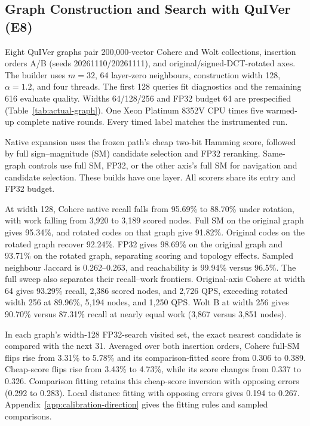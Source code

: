 \documentclass[twoside,11pt]{article}
\begin{document}
\subsection{Graph Construction and Search with QuIVer (E8)}
\label{sec:exp-graph}

Eight QuIVer graphs pair 200{,}000-vector Cohere and Wolt collections, insertion orders A/B (seeds 20261110/20261111), and original/signed-DCT-rotated axes. The builder uses $m=32$, 64 layer-zero neighbours, construction width 128, $\alpha=1.2$, and four threads. The first 128 queries fit diagnostics and the remaining 616 evaluate quality. Widths 64/128/256 and FP32 budget 64 are prespecified (Table~\ref{tab:actual-graph}). One Xeon Platinum 8352V CPU times five warmed-up complete native rounds. Every timed label matches the instrumented run.

Native expansion uses the frozen path's cheap two-bit Hamming score, followed by full sign--magnitude (SM) candidate selection and FP32 reranking. Same-graph controls use full SM, FP32, or the other axis's full SM for navigation and candidate selection. These builds have one layer. All scorers share its entry and FP32 budget.



At width 128, Cohere native recall falls from 95.69\% to 88.70\% under rotation, with work falling from 3{,}920 to 3{,}189 scored nodes. Full SM on the original graph gives 95.34\%, and rotated codes on that graph give 91.82\%. Original codes on the rotated graph recover 92.24\%. FP32 gives 98.69\% on the original graph and 93.71\% on the rotated graph, separating scoring and topology effects. Sampled neighbour Jaccard is 0.262--0.263, and reachability is 99.94\% versus 96.5\%. The full sweep also separates their recall--work frontiers. Original-axis Cohere at width 64 gives 93.29\% recall, 2{,}386 scored nodes, and 2{,}726 QPS, exceeding rotated width 256 at 89.96\%, 5{,}194 nodes, and 1{,}250 QPS. Wolt B at width 256 gives 90.70\% versus 87.31\% recall at nearly equal work (3{,}867 versus 3{,}851 nodes).

In each graph's width-128 FP32-search visited set, the exact nearest candidate is compared with the next 31. Averaged over both insertion orders, Cohere full-SM flips rise from 3.31\% to 5.78\% and its comparison-fitted score from 0.306 to 0.389. Cheap-score flips rise from 3.43\% to 4.73\%, while its score changes from 0.337 to 0.326. Comparison fitting retains this cheap-score inversion with opposing errors (0.292 to 0.283). Local distance fitting with opposing errors gives 0.194 to 0.267. Appendix~\ref{app:calibration-direction} gives the fitting rules and sampled comparisons.
\end{document}
